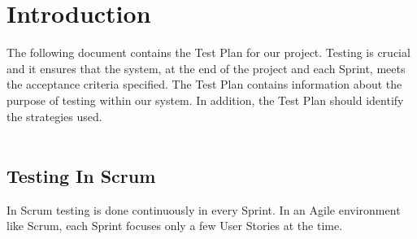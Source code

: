 \section{Introduction}
The following document contains the Test Plan for our project. Testing is crucial and it ensures that the system, at the end of the project and each Sprint, meets the acceptance criteria specified. The Test Plan contains information about the purpose of testing within our system. In addition, the Test Plan should identify the strategies used.\\
\\
\subsection{Testing In Scrum}
In Scrum testing is done continuously in every Sprint. In an Agile environment like Scrum, each Sprint focuses only a few User Stories at the time. 

